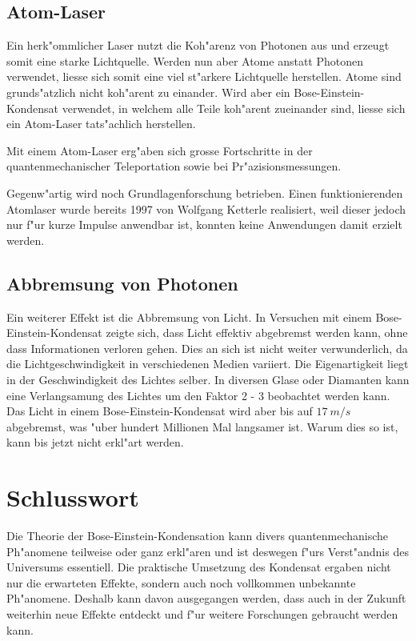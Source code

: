 \begin{refsection}
\subsection{Atom-Laser}
Ein herk"ommlicher Laser nutzt die Koh"arenz von Photonen aus und erzeugt somit eine starke Lichtquelle. Werden nun aber Atome anstatt Photonen verwendet, liesse sich somit eine viel st"arkere Lichtquelle herstellen. Atome sind grunds"atzlich nicht koh"arent zu einander. Wird aber ein Bose-Einstein-Kondensat verwendet, in welchem alle Teile koh"arent zueinander sind, liesse sich ein Atom-Laser tats"achlich herstellen.

Mit einem Atom-Laser erg"aben sich grosse Fortschritte in der quantenmechanischer Teleportation sowie bei Pr"azisionsmessungen.

Gegenw"artig wird noch Grundlagenforschung betrieben. Einen funktionierenden Atomlaser wurde bereits 1997 von Wolfgang Ketterle realisiert, weil dieser jedoch nur f"ur kurze Impulse anwendbar ist, konnten keine Anwendungen damit erzielt werden. 

\subsection{Abbremsung von Photonen}

Ein weiterer Effekt ist die Abbremsung von Licht. In Versuchen mit einem Bose-Einstein-Kondensat zeigte sich, dass Licht effektiv abgebremst werden kann, ohne dass Informationen verloren gehen. Dies an sich ist nicht weiter verwunderlich, da die Lichtgeschwindigkeit in verschiedenen Medien variiert. Die Eigenartigkeit liegt in der Geschwindigkeit des Lichtes selber. In diversen Glase oder Diamanten kann eine Verlangsamung des Lichtes um den Faktor 2 - 3 beobachtet werden kann. Das Licht in einem Bose-Einstein-Kondensat wird aber bis auf $17~m/s$ abgebremst, was "uber hundert Millionen Mal langsamer ist. Warum dies so ist, kann bis jetzt nicht erkl"art werden. \cite{bose:SlowLight}

\section{Schlusswort}

Die Theorie der Bose-Einstein-Kondensation kann divers quantenmechanische Ph"anomene teilweise oder ganz erkl"aren und ist deswegen f"urs Verst"andnis des Universums essentiell. Die praktische Umsetzung des Kondensat ergaben nicht nur die erwarteten Effekte, sondern auch noch vollkommen unbekannte Ph"anomene. Deshalb kann davon ausgegangen werden, dass auch in der Zukunft weiterhin neue Effekte entdeckt und f"ur weitere Forschungen gebraucht werden kann. 

\printbibliography[heading=subbibliography]
\end{refsection}



